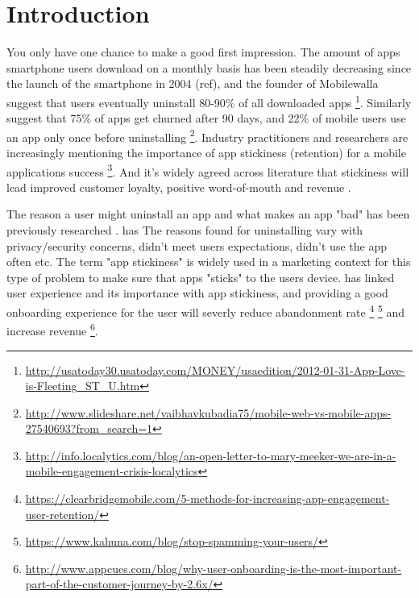 \chapter{Introduction}
\label{chap:introduction}

You only have one chance to make a good first impression. The amount of apps smartphone users download on a monthly basis has been steadily decreasing since the launch of the smartphone in 2004 (ref), and the founder of Mobilewalla suggest that users eventually uninstall 80-90\% of all downloaded apps \footnote{\url{http://usatoday30.usatoday.com/MONEY/usaedition/2012-01-31-App-Love-is-Fleeting\_ST\_U.htm}}. Similarly \cite{Perro2016} suggest that 75\% of apps get churned after 90 days, and 22\% of mobile users use an app only once before uninstalling \footnote{\url{http://www.slideshare.net/vaibhavkubadia75/mobile-web-vs-mobile-apps-27540693?from_search=1}}. Industry practitioners and researchers are increasingly mentioning the importance of app stickiness (retention) for a mobile applications success \cite{Perro2016} \cite{IGIGlobal2016} \cite{Kim2016} \footnote{\url{http://info.localytics.com/blog/an-open-letter-to-mary-meeker-we-are-in-a-mobile-engagement-crisis-localytics}}. And it's widely agreed across literature that stickiness will lead improved customer loyalty, positive word-of-mouth and revenue \cite{Reichheld2000} \cite{Srinivasan2002} \cite{Hsu2016a}.

The reason a user might uninstall an app and what makes an app "bad" has been previously researched \cite{Lin2012} \cite{Shklovski} \cite{Song2014}. \cite{IGIGlobal2016} has  The reasons found for uninstalling vary with privacy/security concerns, didn't meet users expectations, didn't use the app often etc. The term "app stickiness" is widely used in a marketing context for this type of problem to make sure that apps "sticks" to the users device. \cite{IGIGlobal2016} has linked user experience and its importance with app stickiness, and providing a good onboarding experience for the user will severly reduce abandonment rate \footnote{\url{https://clearbridgemobile.com/5-methods-for-increasing-app-engagement-user-retention/}} \footnote{\url{https://www.kahuna.com/blog/stop-spamming-your-users/}} and increase revenue \footnote{\url{http://www.appcues.com/blog/why-user-onboarding-is-the-most-important-part-of-the-customer-journey-by-2.6x/}}.



